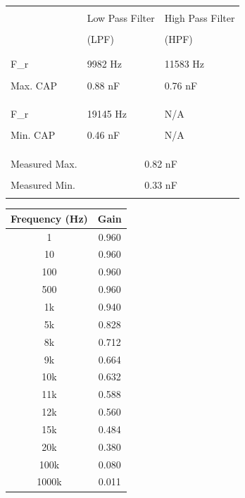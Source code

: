 \documentclass[journal]{IEEEtran}
\begin{document}
\begingroup
    \medskip
    \centering
    \def\arraystretch{0.4}
    \begin{tabular}{lll}
\hline\\
& Low Pass Filter & High Pass Filter\\
\\
& (LPF) & (HPF) \\
\\
\hline
\\
F_{r} & 9982 Hz & 11583 Hz \\
\\
Max. CAP & 0.88 nF & 0.76 nF \\
\\
\hline
& & \\
\\
F_{r} & 19145 Hz & N/A \\
\\
Min. CAP & 0.46 nF & N/A \\
\\
\hline
\\
& & \\
Measured Max. & \multicolumn{2}{c}{ 0.82 nF } \\
\\
Measured Min.& \multicolumn{2}{c}{ 0.33 nF } \\
\\
\hline
\end{tabular}
    \label{fig:tableCAP}
    \medskip
\endgroup

\begingroup
    \medskip
    \centering
    \def\arraystretch{1.5}
    \begin{tabular}{cc}
    \hline
    Frequency (Hz) & Gain \\
    \hline
    1 & 0.960 \\
    10 & 0.960 \\
    100 & 0.960 \\
    500 & 0.960 \\
    1k & 0.940 \\
    5k & 0.828 \\
    8k & 0.712 \\
    9k & 0.664 \\
    10k & 0.632 \\
    11k & 0.588 \\
    12k & 0.560 \\
    15k & 0.484 \\
    20k & 0.380 \\
    100k & 0.080 \\
    1000k & 0.011 \\
    \hline
    \end{tabular}
    \label{fig:tableLPF}
    \medskip
\endgroup
\end{document}
